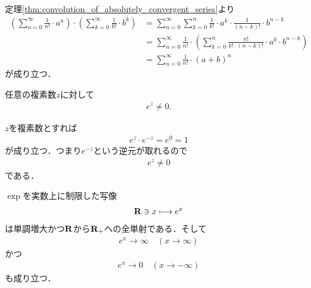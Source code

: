 	\begin{sketch}
		定理\ref{thm:convolution_of_absolutely_convergent_series}より
		\begin{align}
			\left(\sum_{n=0}^\infty \frac{1}{n!} \cdot a^n\right) \cdot \left(\sum_{k=0}^\infty \frac{1}{k!} \cdot b^k\right)
			&= \sum_{n=0}^\infty \sum_{k=0}^n \frac{1}{k!} \cdot a^k \cdot \frac{1}{(n-k)!} \cdot b^{n-k} \\
			&= \sum_{n=0}^\infty \frac{1}{n!} \cdot \left( \sum_{k=0}^n \frac{n!}{k! \cdot (n-k)!} \cdot a^k \cdot b^{n-k} \right) \\
			&= \sum_{n=0}^\infty \frac{1}{n!} \cdot (a+b)^n
		\end{align}
		が成り立つ．
		\QED
	\end{sketch}
	
	\begin{screen}
		\begin{thm}
			任意の複素数$z$に対して
			\begin{align}
				e^z \neq 0.
			\end{align}
		\end{thm}
	\end{screen}
	
	\begin{sketch}
		$z$を複素数とすれば
		\begin{align}
			e^z \cdot e^{-z} = e^0 = 1
		\end{align}
		が成り立つ．つまり$e^{-z}$という逆元が取れるので
		\begin{align}
			e^z \neq 0
		\end{align}
		である．
		\QED
	\end{sketch}
	
	\begin{screen}
		\begin{thm}[指数関数は実数上で単調増大かつ一対一対応]\label{thm:real_valued_exponential_function}
			$\exp$を実数上に制限した写像
			\begin{align}
				\mathbf{R} \ni x \longmapsto e^x
			\end{align}
			は単調増大かつ$\mathbf{R}$から$\mathbf{R}_+$への全単射である．そして
			\begin{align}
				e^x \longrightarrow \infty \quad (x \longrightarrow \infty)
			\end{align}
			かつ
			\begin{align}
				e^x \longrightarrow 0 \quad (x \longrightarrow -\infty)
			\end{align}
			も成り立つ．
		\end{thm}
	\end{screen}
	
